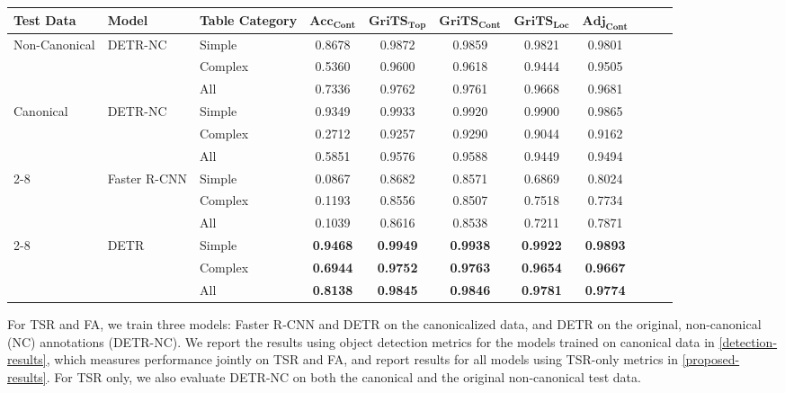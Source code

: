 \documentclass[10pt,twocolumn,letterpaper]{article}
\begin{document}
\begin{table*}
\footnotesize
  \caption{Test performance of the TSR + FA models on PubTables-1M on TSR metrics.}
  \label{proposed-results}
  \centering
  \begin{tabular}{l|l|l|cccccccc}
    \toprule
    \textbf{Test Data} & \textbf{Model} & \textbf{Table Category} & $\textbf{Acc}_\textbf{Cont}$ & $\textbf{GriTS}_\textbf{Top}$ & $\textbf{GriTS}_\textbf{Cont}$ & $\textbf{GriTS}_\textbf{Loc}$ & $\textbf{Adj}_\textbf{Cont}$ \\
    \midrule
    Non-Canonical & DETR-NC & Simple & 0.8678 & 0.9872 & 0.9859 & 0.9821 & 0.9801 \\
    & & Complex & 0.5360 & 0.9600 & 0.9618 & 0.9444 & 0.9505 \\
    & & All & 0.7336 & 0.9762 & 0.9761 & 0.9668 & 0.9681 \\
   \midrule
    Canonical & DETR-NC & Simple & 0.9349 & 0.9933 & 0.9920 & 0.9900 & 0.9865 \\
    & & Complex & 0.2712 & 0.9257 & 0.9290 & 0.9044 & 0.9162 \\
    & & All & 0.5851 & 0.9576 & 0.9588 & 0.9449 & 0.9494 \\
    \cmidrule{2-8}
    & Faster R-CNN & Simple & 0.0867 & 0.8682 & 0.8571 & 0.6869 & 0.8024 \\
    & & Complex & 0.1193 & 0.8556 & 0.8507 & 0.7518 & 0.7734 \\
    & & All & 0.1039 & 0.8616 & 0.8538 & 0.7211 & 0.7871 \\
\cmidrule{2-8}
    & DETR & Simple & \textbf{0.9468} & \textbf{0.9949} & \textbf{0.9938} & \textbf{0.9922} & \textbf{0.9893} \\
    & & Complex & \textbf{0.6944} & \textbf{0.9752} & \textbf{0.9763} & \textbf{0.9654} & \textbf{0.9667} \\
    & & All & \textbf{0.8138} & \textbf{0.9845} & \textbf{0.9846} & \textbf{0.9781} & \textbf{0.9774} \\
    \midrule
  \end{tabular}
\end{table*}

For TSR and FA, we train three models: Faster R-CNN and DETR on the canonicalized data, and DETR on the original, non-canonical (NC) annotations (DETR-NC).
We report the results using object detection metrics for the models trained on canonical data in \cref{detection-results}, which measures performance jointly on TSR and FA, and report results for all models using TSR-only metrics in \cref{proposed-results}.
For TSR only, we also evaluate DETR-NC on both the canonical and the original non-canonical test data.
\end{document}
